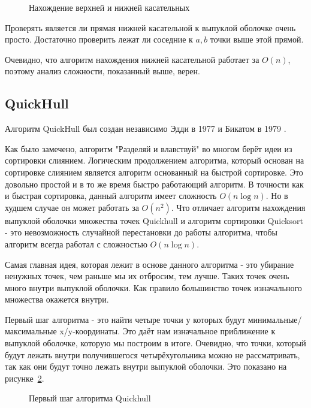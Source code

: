 \begin{figure}[H]
	{\centering
		\hfill
		\subbottom[\label{img:merge_1}]{%
			}
		\hfill
		\subbottom[\label{img:merge_2}]{%
			}
		\hfill
	}
	\caption{Нахождение верхней и нижней касательных}
	\label{img:merge}
\end{figure}


Проверять является ли прямая нижней касательной к выпуклой оболочке очень просто. Достаточно проверить лежат ли соседние к $a, b$ точки выше этой прямой.

Очевидно, что алгоритм нахождения нижней касательной работает за $O(n)$, поэтому анализ сложности, показанный выше, верен.

\subsection{QuickHull} \label{subsect1_1_4}

Алгоритм QuickHull был создан независимо Эдди в 1977 и Бикатом в 1979 \cite{barber1996Quickhull}.

Как было замечено, алгоритм "Разделяй и влавствуй" во многом берёт идеи из сортировки слиянием. Логическим продолжением алгоритма, который основан на сортировке слиянием является алгоритм основанный на быстрой сортировке. Это довольно простой и в то же время быстро работающий алгоритм. В точности как и быстрая сортировка, данный алгоритм имеет сложность $O(n \log n)$. Но в худшем случае он может работать за $O(n^2)$. Что отличает алгоритм нахождения выпуклой оболочки множества точек Quickhull и алгоритм сортировки Quicksort - это невозможность случайной перестановки до работы алгоритма, чтобы алгоритм всегда работал с сложностью $O(n \log n)$.

Самая главная идея, которая лежит в основе данного алгоритма - это убирание ненужных точек, чем раньше мы их отбросим, тем лучше. Таких точек очень много внутри выпуклой оболочки. Как правило большинство точек изначального множества окажется внутри.

Первый шаг алгоритма - это найти четыре точки у которых будут минимальные/максимальные x/y-координаты. Это даёт нам изначальное приближение к выпуклой оболочке, которую мы построим в итоге. Очевидно, что точки, который будут лежать внутри получившегося четырёхугольника можно не рассматривать, так как они будут точно лежать внутри выпуклой оболочки. Это показано на рисунке~\ref{img:quickhull_first}.

\begin{figure}[H]
	{\centering
		\hfill
		\subbottom{%
			}
		\hfill
	}
	\caption{Первый шаг алгоритма Quickhull}
	\label{img:quickhull_first}
\end{figure}

